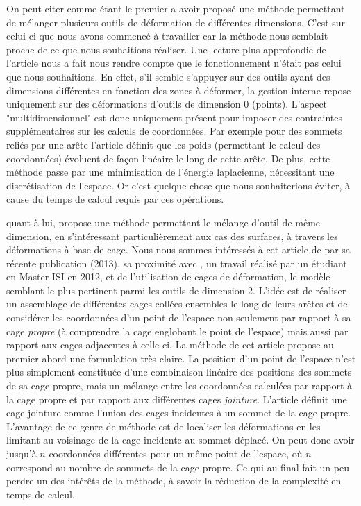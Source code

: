 On peut citer \cite{JBPS11} comme étant le premier a avoir proposé une
méthode permettant de mélanger plusieurs outils de déformation de
différentes dimensions.  C'est sur celui-ci que nous avons commencé à
travailler car la méthode nous semblait proche de ce que nous
souhaitions réaliser. Une lecture plus approfondie de l'article nous a
fait nous rendre compte que le fonctionnement n'était pas celui que
nous souhaitions. En effet, s'il semble s'appuyer sur des outils ayant
des dimensions différentes en fonction des zones à déformer, la
gestion interne repose uniquement sur des déformations d'outils de
dimension 0 (points). L'aspect "multidimensionnel" est donc uniquement
présent pour imposer des contraintes supplémentaires sur les calculs
de coordonnées. Par exemple pour des sommets reliés par une arête
l'article définit que les poids (permettant le calcul des coordonnées)
évoluent de façon linéaire le long de cette arête. De plus, cette
méthode passe par une minimisation de l'énergie laplacienne,
nécessitant une discrétisation de l'espace. Or c'est quelque chose que
nous souhaiterions éviter, à cause du temps de calcul requis par ces
opérations.

\cite{GPCP13} quant à lui, propose une méthode permettant le mélange
d'outil de même dimension, en s'intéressant particulièrement aux cas
des surfaces, à travers les déformations à base de cage.  Nous nous
sommes intéressés à cet article de par sa récente publication (2013),
sa proximité avec \cite{Hur12}, un travail réalisé par un étudiant en
Master ISI en 2012, et de l'utilisation de cages de déformation, le
modèle semblant le plus pertinent parmi les outils de dimension 2.
L'idée est de réaliser un assemblage de différentes cages collées
ensembles le long de leurs arêtes et de considérer les coordonnées
d'un point de l'espace non seulement par rapport à sa cage
\textit{propre} (à comprendre la cage englobant le point de l'espace)
mais aussi par rapport aux cages adjacentes à celle-ci.  La méthode de
cet article propose au premier abord une formulation très claire. La
position d'un point de l'espace n'est plus simplement constituée d'une
combinaison linéaire des positions des sommets de sa cage propre, mais
un mélange entre les coordonnées calculées par rapport à la cage
propre et par rapport aux différentes cages \textit{jointure}.
L'article définit une cage jointure comme l'union des cages
incidentes à un sommet de la cage propre.  L'avantage de ce genre de
méthode est de localiser les déformations en les limitant au voisinage
de la cage incidente au sommet déplacé.  On peut donc avoir jusqu'à
$n$ coordonnées différentes pour un même point de l'espace, où $n$
correspond au nombre de sommets de la cage propre. Ce qui au final
fait un peu perdre un des intérêts de la méthode, à savoir la
réduction de la complexité en temps de calcul.


